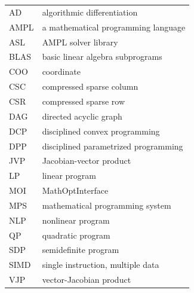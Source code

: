 \chapter*{\abbrevname}
\pagestyle{pagenumber}
%
\begin{acronym}
\end{acronym}
%
\begin{longtable}{lp{5in}}
AD         & algorithmic differentiation\\
AMPL       & a mathematical programming language\\
ASL        & AMPL solver library\\
BLAS       & basic linear algebra subprograms\\
COO        & coordinate\\
CSC        & compressed sparse column\\
CSR        & compressed sparse row\\
DAG        & directed acyclic graph\\
DCP        & disciplined convex programming\\
DPP        & disciplined parametrized programming\\
JVP        & Jacobian-vector product\\
LP         & linear program\\
MOI        & MathOptInterface\\
MPS        & mathematical programming system\\
NLP        & nonlinear program\\
QP         & quadratic program\\
SDP        & semidefinite program\\
SIMD       & single instruction, multiple data\\
VJP        & vector-Jacobian product\\
\end{longtable}


